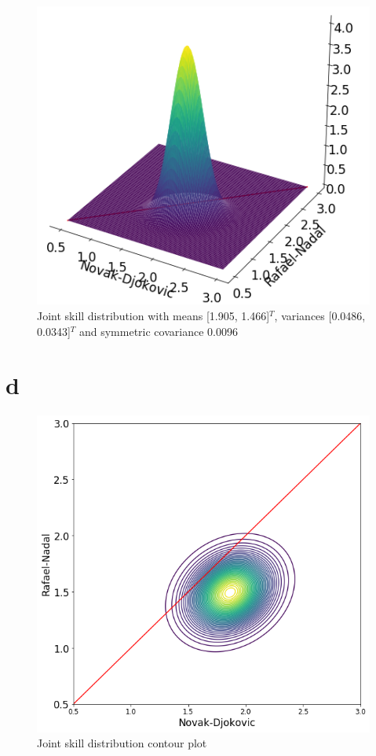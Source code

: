 \documentclass[twoside,twocolumn]{article}
\begin{document}
\begin{figure}[h]
  \centering
    \includegraphics[width=\linewidth]{d_2}
  \caption{Joint skill distribution with means [1.905, 1.466]$^T$, variances [0.0486, 0.0343]$^T$ and symmetric covariance 0.0096}
  \label{fig:d_2}
\end{figure}

\section{d}
\begin{figure}[h]
  \centering
    \includegraphics[width=\linewidth]{d_3}
  \caption{Joint skill distribution contour plot }
  \label{fig:d_3}
\end{figure}
\end{document}
